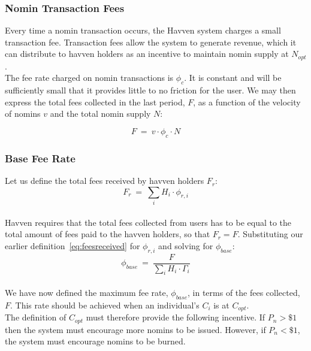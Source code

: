 \newpage

\subsubsection{Nomin Transaction Fees}
Every time a nomin transaction occurs, the Havven system charges a small
transaction fee. Transaction fees allow the system to generate revenue, which
it can distribute to havven holders as an incentive to maintain nomin supply
at \(N_{opt}\). \\

\noindent The fee rate charged on nomin transactions is \(\phi_c\). It is
constant and will be sufficiently small that it provides little to no
friction for the user. We may then express the total fees collected in the
last period, \(F\), as a function of the velocity of nomins \(v\) and the total
nomin supply \(N\):

\begin{equation}
    F \ = \ v \cdot \phi_c \cdot N
\end{equation}

\subsubsection{Base Fee Rate}

Let us define the total fees received by havven holders \(F_{r}\): \\

\begin{equation}
F_{r} \ = \ \sum_{i} H_{i} \cdot \phi_{r,i} \label{eq:totalfeesreceived}
\end{equation} \\

\noindent Havven requires that the total fees collected from users has to be
equal to the total amount of fees paid to the havven holders, so that \(F_{r}
= F\). Substituting our earlier definition~\eqref{eq:feesreceived} for
\(\phi_{r,i}\) and solving for \(\phi_{base} \): \\

\begin{equation}
\phi_{base} \ = \ \frac{F}{\sum_{i} H_{i} \cdot \mathit{\Gamma}_{i}} \label{eq:10}
\end{equation} \\

\noindent We have now defined the maximum fee rate, \(\phi_{base}\), in terms
of the fees collected, \(F\). This rate should be achieved when an individual's
\(C_i\) is at \(C_{opt}\). \\

\noindent The definition of \(C_{opt}\) must therefore provide the following
incentive. If \(P_n > \$1\) then the system must encourage more nomins to be
issued. However, if \(P_n < \$1\), the system must encourage nomins to be
burned.

